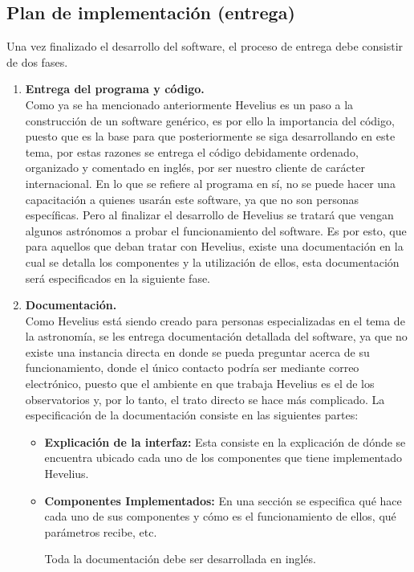 \documentclass[letterpaper,spanish,10pt]{article}
\begin{document}
\subsection{Plan de implementaci\'on (entrega)}
Una vez finalizado el desarrollo del software, el proceso de entrega debe consistir de dos fases.
\begin{enumerate}
	\item {\bf{Entrega del programa y c\'odigo.}}\\
         Como ya se ha mencionado anteriormente Hevelius es un paso a la construcci\'on de un software gen\'erico, es por ello la importancia del c\'odigo, puesto que es la base para que posteriormente se siga desarrollando en este tema, por estas razones se entrega el c\'odigo debidamente ordenado, organizado y comentado en ingl\'es, por ser nuestro cliente de car\'acter internacional.
    En lo que se refiere al programa en s\'i, no se puede hacer una capacitaci\'on a quienes usar\'an este software, ya que no son personas espec\'ificas. Pero al finalizar el desarrollo de Hevelius se tratar\'a que vengan algunos astr\'onomos a probar el funcionamiento del software. Es por esto, que para aquellos que deban tratar con Hevelius, existe una documentaci\'on en la cual se detalla los componentes y la utilizaci\'on de ellos, esta documentaci\'on ser\'a especificados en la siguiente fase.\\

	\item{\bf{Documentaci\'on.}}\\
         Como Hevelius est\'a siendo creado para personas especializadas en el tema de la astronom\'ia, se les entrega documentaci\'on detallada del software, ya que no existe una instancia directa en donde se pueda preguntar acerca de su funcionamiento, donde el \'unico contacto podr\'ia ser mediante correo electr\'onico, puesto que el ambiente en que trabaja Hevelius es el de los observatorios y, por lo tanto, el trato directo se hace m\'as complicado.
La especificaci\'on de la documentaci\'on consiste en las siguientes partes:
\begin{itemize}
	\item {\bf{Explicaci\'on de la interfaz:}} Esta consiste en la explicaci\'on de d\'onde se encuentra ubicado cada uno de los componentes que tiene implementado Hevelius.
	\item{ \bf{Componentes Implementados:}} En una secci\'on se especifica qu\'e hace cada uno de sus componentes y c\'omo es el funcionamiento de ellos, qu\'e par\'ametros recibe, etc.

Toda la documentaci\'on debe ser desarrollada en ingl\'es.
\end{itemize}
\end{enumerate}
\end{document}
